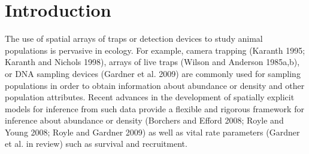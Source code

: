 \documentclass[useAMS,referee]{biom}
\begin{document}
\maketitle


%






\linenumbers

\section{Introduction}


The use of spatial arrays of traps or detection devices to study
animal populations is pervasive in ecology.  For example, camera
trapping (Karanth 1995; Karanth and Nichols 1998), arrays of live traps (Wilson and
Anderson 1985a,b), or DNA sampling devices (Gardner et al. 2009) are commonly
used for sampling populations in order to obtain information about
abundance or density and other population attributes.  Recent advances
in the development of spatially explicit models for inference from
such data provide a flexible and rigorous framework for inference
about abundance or density (Borchers and Efford 2008; Royle and Young
2008; Royle and Gardner 2009) as well as vital rate parameters
(Gardner et al. in review) such as survival and recruitment.
\end{document}

